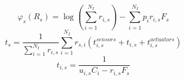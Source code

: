 \documentclass[conference]{IEEEtran}
\begin{document}
    \begin{equation}
      \varphi_s(R_s)=\log(\sum_{i=1}^{N_I} r_{i,s}) - \sum_{i=1}^{N_I}{p_i r_{i,s} F_s}
    \end{equation}
    \begin{equation}
      t_s = \frac{1}{\sum_{i=1}^{N_I} r_{i,s}}\sum_{i=1}^{N_I}{r_{s,i}(t^{sensors}_{i,s} + t_{i,s} + t^{actuators}_{i,s})}
    \end{equation}
    \begin{equation}
      t_{i,s} = \frac{1}{u_{i,s} C_i - r_{i,s} F_s}
    \end{equation}
\end{document}
